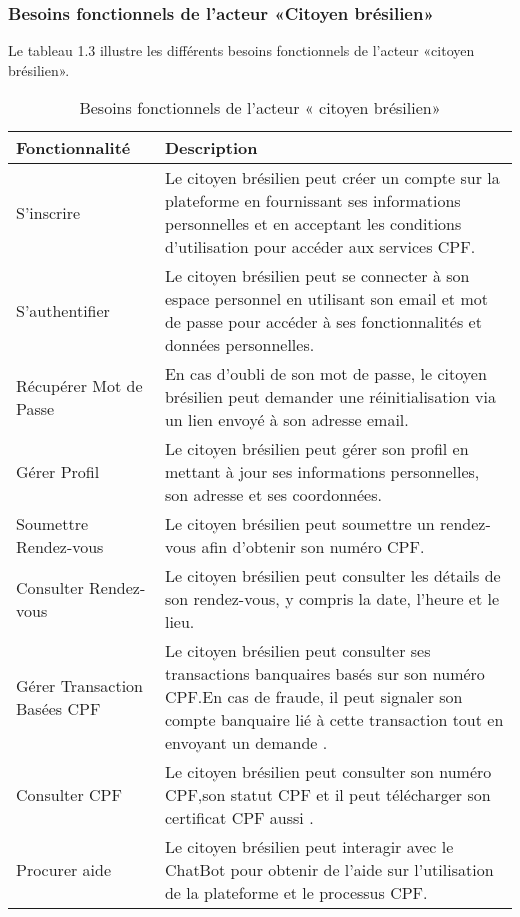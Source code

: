 \subsubsection{Besoins fonctionnels de l'acteur «Citoyen brésilien»}

Le tableau 1.3 illustre les différents besoins fonctionnels de l'acteur «citoyen brésilien».
\begin{longtable}
{| >{\centering\arraybackslash}p{4.2cm} | >{\arraybackslash}p{12.5cm} |}
\caption{\centering Besoins fonctionnels de l'acteur « citoyen brésilien»} \label{tab:besoins-citoyens} \\
\hline
\rowcolor{gray!30} \textbf{Fonctionnalité} & \textbf{Description} \\
\hline
\endfirsthead

\endhead

\hline
\endfoot

\hline
\endlastfoot

S'inscrire & Le citoyen brésilien peut créer un compte sur la plateforme en fournissant ses informations personnelles et en acceptant les conditions d'utilisation pour accéder aux services CPF. \\
\hline
S'authentifier & Le citoyen brésilien peut se connecter à son espace personnel en utilisant son email et mot de passe pour accéder à ses fonctionnalités et données personnelles. \\
\hline
Récupérer Mot de Passe & En cas d'oubli de son mot de passe, le citoyen brésilien peut demander une réinitialisation via un lien envoyé à son adresse email. \\
\hline
Gérer Profil & Le citoyen brésilien peut gérer son profil en mettant à jour ses informations personnelles, son adresse et ses coordonnées. \\
\hline
Soumettre Rendez-vous & Le citoyen brésilien peut soumettre un rendez-vous afin d'obtenir son numéro CPF. \\
\hline
Consulter Rendez-vous& Le citoyen brésilien peut consulter les détails de son rendez-vous, y compris la date, l'heure et le lieu.\\
\hline
Gérer Transaction Basées CPF & Le citoyen brésilien peut consulter ses transactions banquaires basés sur son numéro CPF.En cas de fraude, il peut signaler  son compte banquaire lié à cette transaction tout en envoyant un demande . \\
\hline
Consulter CPF & Le citoyen brésilien peut consulter son numéro CPF,son statut CPF et il peut télécharger son certificat CPF aussi . \\
\hline
Procurer aide & Le citoyen brésilien peut interagir avec le ChatBot pour obtenir de l'aide sur l'utilisation de la plateforme et le processus CPF. \\
\hline

\end{longtable}




